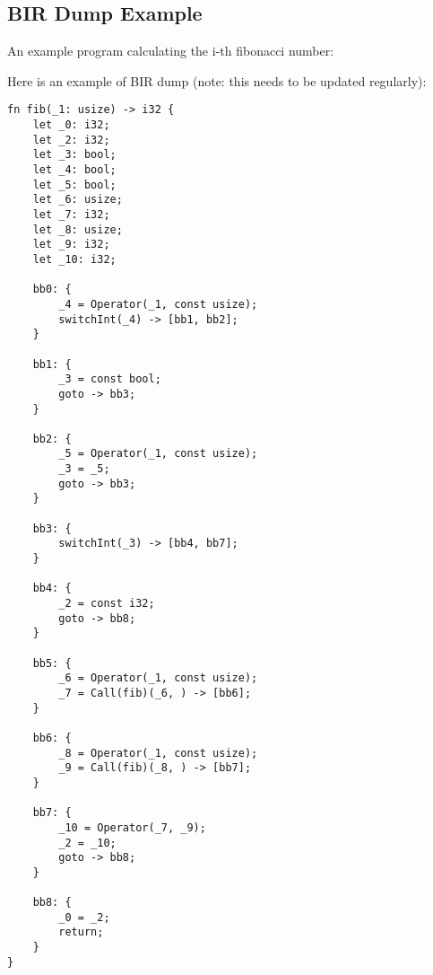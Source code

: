 \hypertarget{bir-dump-example}{%
\subsection{BIR Dump Example}\label{bir-dump-example}}

An example program calculating the i-th fibonacci number:

\begin{Shaded}
\begin{Highlighting}[]

\OperatorTok{:} \NormalTok{) }\OperatorTok{{-}\textgreater{}}  \OperatorTok{\{}
    \OperatorTok{==}  \OperatorTok{||}\OperatorTok{==}  \OperatorTok{\{}
    \OperatorTok{\}}  \OperatorTok{\{}
\OperatorTok{{-}} \NormalTok{) }\OperatorTok{+}\OperatorTok{{-}} \NormalTok{)}
    \OperatorTok{\}}
\OperatorTok{\}}
\end{Highlighting}
\end{Shaded}

Here is an example of BIR dump (note: this needs to be updated
regularly):

\begin{verbatim}
fn fib(_1: usize) -> i32 {
    let _0: i32;
    let _2: i32;
    let _3: bool;
    let _4: bool;
    let _5: bool;
    let _6: usize;
    let _7: i32;
    let _8: usize;
    let _9: i32;
    let _10: i32;

    bb0: {
        _4 = Operator(_1, const usize);
        switchInt(_4) -> [bb1, bb2];
    }

    bb1: {
        _3 = const bool;
        goto -> bb3;
    }

    bb2: {
        _5 = Operator(_1, const usize);
        _3 = _5;
        goto -> bb3;
    }

    bb3: {
        switchInt(_3) -> [bb4, bb7];
    }

    bb4: {
        _2 = const i32;
        goto -> bb8;
    }

    bb5: {
        _6 = Operator(_1, const usize);
        _7 = Call(fib)(_6, ) -> [bb6];
    }

    bb6: {
        _8 = Operator(_1, const usize);
        _9 = Call(fib)(_8, ) -> [bb7];
    }

    bb7: {
        _10 = Operator(_7, _9);
        _2 = _10;
        goto -> bb8;
    }

    bb8: {
        _0 = _2;
        return;
    }
}

\end{verbatim}

